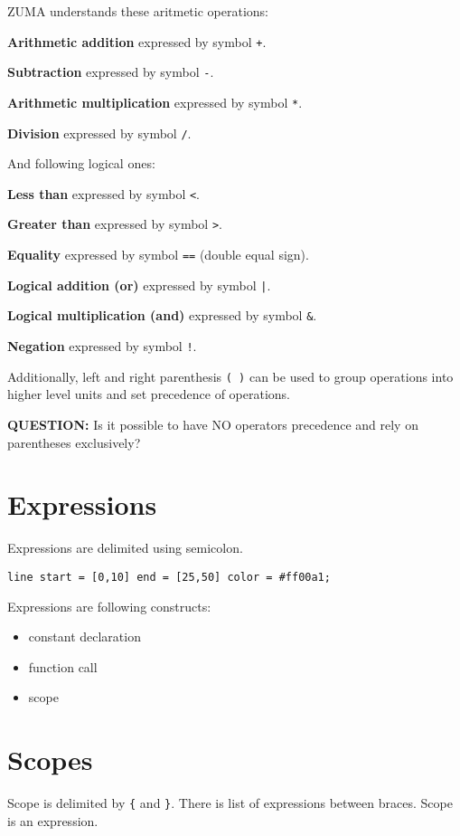 \documentclass{scrreprt}
\newcommand{\zuma}{ZUMA}
\begin{document}
\zuma{} understands these aritmetic operations:

\textbf{Arithmetic addition} expressed by symbol \texttt{+}.

\textbf{Subtraction} expressed by symbol \texttt{-}.

\textbf{Arithmetic multiplication} expressed by symbol \texttt{*}.

\textbf{Division} expressed by symbol \texttt{/}.

And following logical ones:

\textbf{Less than} expressed by symbol \texttt{<}.

\textbf{Greater than} expressed by symbol \texttt{>}.

\textbf{Equality} expressed by symbol \texttt{==} (double equal sign).

\textbf{Logical addition (or)} expressed by symbol \texttt{|}.

\textbf{Logical multiplication (and)} expressed by symbol \texttt{\&}.

\textbf{Negation} expressed by symbol \texttt{!}.

Additionally, left and right parenthesis \texttt{( )} can be used to group operations into higher level units and set precedence of operations.

\color{red} \textbf{QUESTION:} \color{black} Is it possible to have NO operators precedence and rely on parentheses exclusively? 


\section{Expressions}

Expressions are delimited using semicolon.

\texttt{line start = [0,10] end = [25,50] color = \#ff00a1;}

Expressions are following constructs:

\begin{itemize}
    \item constant declaration
    \item function call
    \item scope
\end{itemize}


\section{Scopes}

Scope is delimited by \texttt{\{} and \texttt{\}}. There is list of expressions between braces. Scope is an expression.
\end{document}
